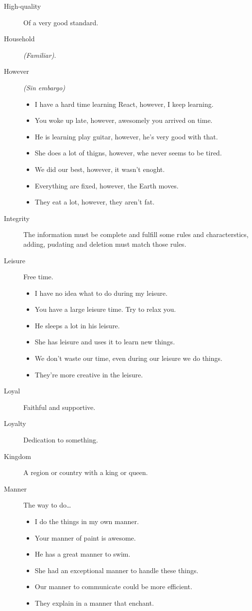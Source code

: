 \begin{multicols}{2}
\begin{description}
\item[High-quality] Of a very good standard.

\item[Household] \emph{(Familiar)}.

\item[However] \emph{(Sin embargo)}
\begin{itemize}
\item I have a hard time learning React, however, I keep learning.
\item You woke up late, however, awesomely you arrived on time.
\item He is learning play guitar, however, he's very good with that.
\item She does a lot of thigns, however, whe never seems to be tired.
\item We did our best, however, it wasn't enoght.
\item Everything are fixed, however, the Earth moves.
\item They eat a lot, however, they aren't fat.
\end{itemize}

\item[Integrity] The information must be complete and fulfill some rules and characterstics, adding, pudating and deletion must match those rules.

\item[Leisure] Free time.
\begin{itemize}
\item I have no idea what to do during my leisure.
\item You have a large leisure time. Try to relax you.
\item He sleeps a lot in his leisure.
\item She has leisure and uses it to learn new things.
\item We don't waste our time, even during our leisure  we do things.
\item They're more creative in the leisure.
\end{itemize}

\item[Loyal] Faithful and supportive.

\item[Loyalty]Dedication to something.

\item[Kingdom] A region or country with a king or queen.

\item[Manner] The way to do\dots
\begin{itemize}
\item I do the things in my own manner.
\item Your manner of paint is awesome.
\item He has a great manner to swim.
\item She had an exceptional manner to handle these things.
\item Our manner to communicate could be more efficient.
\item They explain in a manner that enchant.
\end{itemize}


\end{description}
\end{multicols}
